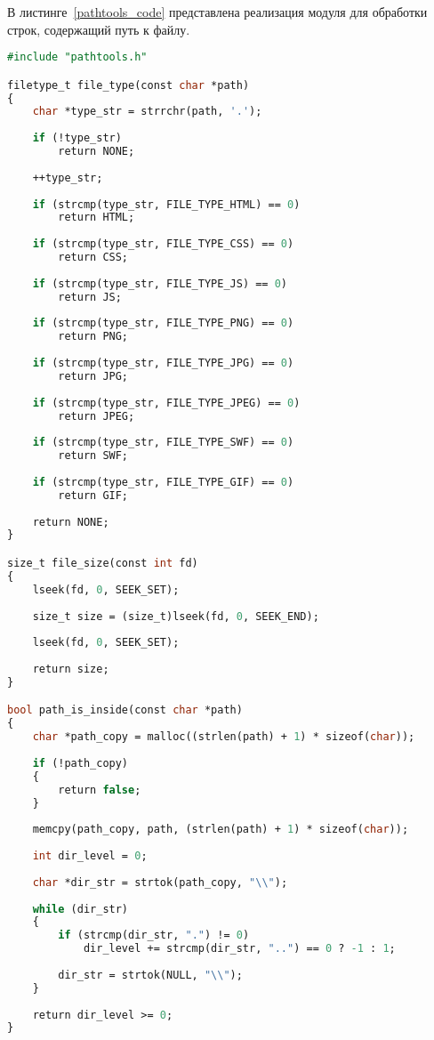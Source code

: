 В листинге~\ref{pathtools_code} представлена реализация модуля для обработки строк, содержащий путь к файлу.
\begin{lstlisting}[label=pathtools_code,caption=Реализация модуля для обработки строк\, содержащий путь к файлу,language=Caml]
#include "pathtools.h"

filetype_t file_type(const char *path)
{
	char *type_str = strrchr(path, '.');
	
	if (!type_str)
		return NONE;
	
	++type_str;
	
	if (strcmp(type_str, FILE_TYPE_HTML) == 0)
		return HTML;
	
	if (strcmp(type_str, FILE_TYPE_CSS) == 0)
		return CSS;
	
	if (strcmp(type_str, FILE_TYPE_JS) == 0)
		return JS;
	
	if (strcmp(type_str, FILE_TYPE_PNG) == 0)
		return PNG;
	
	if (strcmp(type_str, FILE_TYPE_JPG) == 0)
		return JPG;
	
	if (strcmp(type_str, FILE_TYPE_JPEG) == 0)
		return JPEG;
	
	if (strcmp(type_str, FILE_TYPE_SWF) == 0)
		return SWF;
	
	if (strcmp(type_str, FILE_TYPE_GIF) == 0)
		return GIF;
	
	return NONE;
}

size_t file_size(const int fd)
{
	lseek(fd, 0, SEEK_SET);
	
	size_t size = (size_t)lseek(fd, 0, SEEK_END);
	
	lseek(fd, 0, SEEK_SET);
	
	return size;
}

bool path_is_inside(const char *path)
{
	char *path_copy = malloc((strlen(path) + 1) * sizeof(char));
	
	if (!path_copy)
	{
		return false;
	}
	
	memcpy(path_copy, path, (strlen(path) + 1) * sizeof(char));
	
	int dir_level = 0;
	
	char *dir_str = strtok(path_copy, "\\");
	
	while (dir_str)
	{
		if (strcmp(dir_str, ".") != 0)
			dir_level += strcmp(dir_str, "..") == 0 ? -1 : 1;
		
		dir_str = strtok(NULL, "\\");
	}
	
	return dir_level >= 0;
}
\end{lstlisting}

